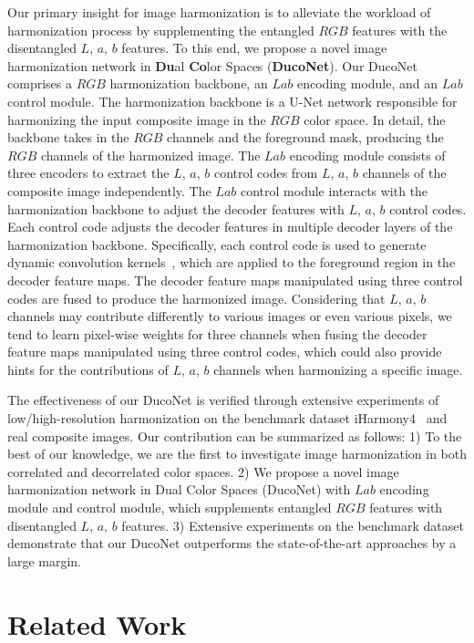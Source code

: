 \documentclass[sigconf]{acmart}
\begin{document}
Our primary insight for image harmonization is to alleviate the workload of harmonization process by supplementing the entangled $RGB$ features with the disentangled $L$, $a$, $b$ features. 
To this end, we propose a novel image harmonization network in \textbf{Du}al \textbf{Co}lor Spaces (\textbf{DucoNet}). 
Our DucoNet comprises a $RGB$ harmonization backbone, an $Lab$ encoding module, and an $Lab$ control module. 
The harmonization backbone is a U-Net network responsible for harmonizing the input composite image in the $RGB$ color space. In detail, the backbone takes in the $RGB$ channels and the foreground mask, producing the $RGB$ channels of the harmonized image. 
The $Lab$ encoding module consists of three encoders to extract the $L$, $a$, $b$ control codes from $L$, $a$, $b$ channels of the composite image independently. 
The $Lab$ control module interacts with the harmonization backbone to adjust the decoder features with $L$, $a$, $b$ control codes. 
Each control code adjusts the decoder features in multiple decoder layers of the harmonization backbone. Specifically, each control code is used to generate dynamic convolution kernels~\cite{styleganv2}, which are applied to the foreground region in the decoder feature maps. The decoder feature maps manipulated using three control codes are fused to produce the harmonized image. 
Considering that $L$, $a$, $b$ channels may contribute differently to various images or even various pixels, we tend to learn pixel-wise weights for three channels when fusing the decoder feature maps manipulated using three control codes, which could also provide hints for the contributions of $L$, $a$, $b$ channels when harmonizing a specific image. 

The effectiveness of our DucoNet is verified through extensive experiments of low/high-resolution harmonization on the benchmark dataset iHarmony4~\cite{dovenet} and real composite images.
Our contribution can be summarized as follows: 1) To the best of our knowledge, we are the first to investigate image harmonization in both correlated and decorrelated color spaces. 2) We propose a novel image harmonization network in Dual Color Spaces (DucoNet) with  $Lab$ encoding module and control module, which supplements entangled $RGB$ features with disentangled $L$, $a$, $b$ features. 3) Extensive experiments on the benchmark dataset demonstrate that our DucoNet outperforms the state-of-the-art approaches by a large margin.


\section{Related Work}
\end{document}
